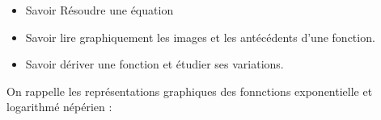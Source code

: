 \documentclass[10pt,a4paper]{article}
\begin{document}

\vspace{-0.3cm}


\begin{prerequis}
\begin{itemize}        
        \item Savoir Résoudre une équation
        \item Savoir lire graphiquement les images et les antécédents d'une fonction.
        \item Savoir dériver une fonction et étudier ses variations.
\end{itemize}

\end{prerequis}


On rappelle les représentations graphiques des fonnctions exponentielle et logarithmé népérien :
\end{document}
